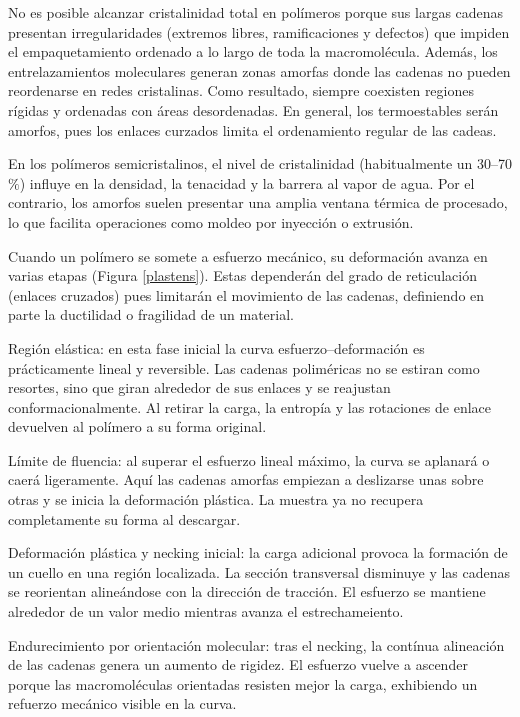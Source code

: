 No es posible alcanzar cristalinidad total en polímeros porque sus largas cadenas presentan irregularidades (extremos libres, ramificaciones y defectos) que impiden el empaquetamiento ordenado a lo largo de toda la macromolécula. Además, los entrelazamientos moleculares generan zonas amorfas donde las cadenas no pueden reordenarse en redes cristalinas. Como resultado, siempre coexisten regiones rígidas y ordenadas con áreas desordenadas. En general, los termoestables serán amorfos, pues los enlaces curzados limita el ordenamiento regular de las cadeas.

En los polímeros semicristalinos, el nivel de cristalinidad (habitualmente un 30–70$\%$) influye en la densidad, la tenacidad y la barrera al vapor de agua. Por el contrario, los amorfos suelen presentar una amplia ventana térmica de procesado, lo que facilita operaciones como moldeo por inyección o extrusión.

Cuando un polímero se somete a esfuerzo mecánico, su deformación avanza en varias etapas (Figura \ref{plastens}). Estas dependerán del grado de reticulación (enlaces cruzados) pues limitarán el movimiento de las cadenas, definiendo en parte la ductilidad o fragilidad de un material.

Región elástica: en esta fase inicial la curva esfuerzo–deformación es prácticamente lineal y reversible. Las cadenas poliméricas no se estiran como resortes, sino que giran alrededor de sus enlaces y se reajustan conformacionalmente. Al retirar la carga, la entropía y las rotaciones de enlace devuelven al polímero a su forma original.

Límite de fluencia: al superar el esfuerzo lineal máximo, la curva se aplanará o caerá ligeramente. Aquí las cadenas amorfas empiezan a deslizarse unas sobre otras y se inicia la deformación plástica. La muestra ya no recupera completamente su forma al descargar.

Deformación plástica y necking inicial: la carga adicional provoca la formación de un cuello en una región localizada. La sección transversal disminuye y las cadenas se reorientan alineándose con la dirección de tracción. El esfuerzo se mantiene alrededor de un valor medio mientras avanza el estrechameiento.

Endurecimiento por orientación molecular: tras el necking, la contínua alineación de las cadenas genera un aumento de rigidez. El esfuerzo vuelve a ascender porque las macromoléculas orientadas resisten mejor la carga, exhibiendo un refuerzo mecánico visible en la curva.

